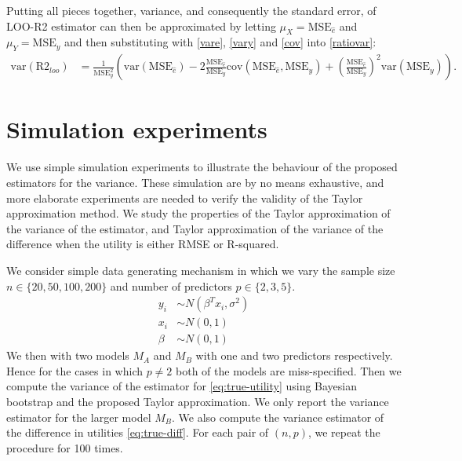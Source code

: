 \documentclass{article}
\begin{document}
 Putting all pieces together, variance, and consequently the standard error, of LOO-R2 estimator can then be approximated by letting $\mu_X = \text{MSE}_{\hat{e}}$ and $\mu_Y = \text{MSE}_y$ and then substituting with \eqref{vare}, \eqref{vary} and \eqref{cov} into \eqref{ratiovar}:
 \begin{align}
     \text{var}(\text{R2}_{loo}) &= \frac{1}{\text{MSE}_y^2} \left( \text{var}(\text{MSE}_{\hat{e}}) - 2 \frac{\text{MSE}_{\hat{e}}}{\text{MSE}_y} \text{cov}(\text{MSE}_{\hat{e}}, \text{MSE}_{y} ) +  \left( \frac{\text{MSE}_{\hat{e}}}{\text{MSE}_y} \right)^2 \text{var}(\text{MSE}_y) \right) \label{eq:loor2-se}.
 \end{align}
 
\section{Simulation experiments}
We use simple simulation experiments to illustrate the behaviour of the proposed estimators for the variance. These simulation are by no means exhaustive, and more elaborate experiments are needed to verify the validity of the Taylor approximation method. We study the properties of the Taylor approximation of the variance of the estimator, and Taylor approximation of the variance of the difference when the utility is either RMSE or R-squared.

We consider simple data generating  mechanism in which we vary the sample size $n \in \{20, 50, 100, 200 \}$ and number of predictors $p \in \{ 2, 3, 5 \}$.
\begin{equation*}
    \begin{aligned}
    y_i &\sim N(\beta^T x_i, \sigma^2) \\
    x_i &\sim N(0, 1) \\
    \beta &\sim N(0, 1)
    \end{aligned}
\end{equation*}
We then with two models $M_A$ and $M_B$ with one and two predictors respectively. Hence for the cases in which $p \neq 2$ both of the models are miss-specified. Then we compute the variance of the estimator for \eqref{eq:true-utility} using Bayesian bootstrap and the proposed Taylor approximation. We only report the variance estimator for the larger model $M_B$. We also compute the variance estimator of the difference in utilities \eqref{eq:true-diff}. For each pair of $(n, p)$, we repeat the procedure for 100 times.
\end{document}
